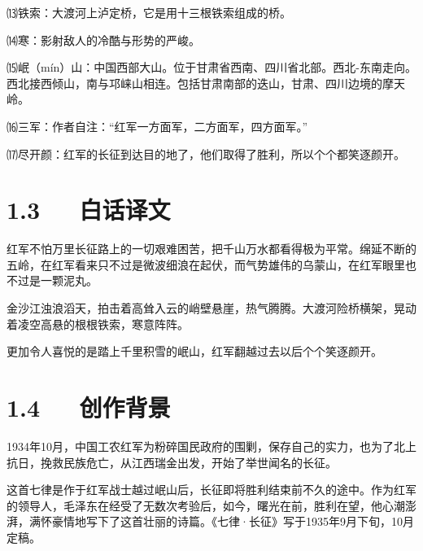 \documentclass[letterpaper,12pt,english]{sphinxmanual}
\begin{document}
⒀铁索：大渡河上泸定桥，它是用十三根铁索组成的桥。

⒁寒：影射敌人的冷酷与形势的严峻。

⒂岷（mín）山：中国西部大山。位于甘肃省西南、四川省北部。西北-东南走向。西北接西倾山，南与邛崃山相连。包括甘肃南部的迭山，甘肃、四川边境的摩天岭。

⒃三军：作者自注：“红军一方面军，二方面军，四方面军。”

⒄尽开颜：红军的长征到达目的地了，他们取得了胜利，所以个个都笑逐颜开。


\section{1.3   白话译文}
\label{\detokenize{p01_u6563_u6587/_u6bdb_u6cfd_u4e1c-_u4e03_u5f8b_xb7_u957f_u5f81:id5}}
红军不怕万里长征路上的一切艰难困苦，把千山万水都看得极为平常。绵延不断的五岭，在红军看来只不过是微波细浪在起伏，而气势雄伟的乌蒙山，在红军眼里也不过是一颗泥丸。

金沙江浊浪滔天，拍击着高耸入云的峭壁悬崖，热气腾腾。大渡河险桥横架，晃动着凌空高悬的根根铁索，寒意阵阵。

更加令人喜悦的是踏上千里积雪的岷山，红军翻越过去以后个个笑逐颜开。


\section{1.4   创作背景}
\label{\detokenize{p01_u6563_u6587/_u6bdb_u6cfd_u4e1c-_u4e03_u5f8b_xb7_u957f_u5f81:id6}}
1934年10月，中国工农红军为粉碎国民政府的围剿，保存自己的实力，也为了北上抗日，挽救民族危亡，从江西瑞金出发，开始了举世闻名的长征。

这首七律是作于红军战士越过岷山后，长征即将胜利结束前不久的途中。作为红军的领导人，毛泽东在经受了无数次考验后，如今，曙光在前，胜利在望，他心潮澎湃，满怀豪情地写下了这首壮丽的诗篇。《七律·长征》写于1935年9月下旬，10月定稿。
\end{document}
